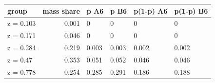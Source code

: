 \begingroup\small
\setlength{\tabcolsep}{3pt}
\renewcommand{\arraystretch}{1.04}
\begin{tabularx}{\linewidth}{XrXXXX}
\toprule
group & mass share & p A6 & p B6 & p(1-p) A6 & p(1-p) B6 \\
\midrule
z = 0.103 & 0.001 & 0 & 0 & 0 & 0 \\
z = 0.171 & 0.046 & 0 & 0 & 0 & 0 \\
z = 0.284 & 0.219 & 0.003 & 0.003 & 0.002 & 0.002 \\
z = 0.47 & 0.353 & 0.051 & 0.052 & 0.046 & 0.046 \\
z = 0.778 & 0.254 & 0.285 & 0.291 & 0.186 & 0.188 \\
\bottomrule
\end{tabularx}
\endgroup
